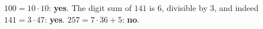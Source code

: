 $100=10\cdot10$: \textbf{yes}. The digit sum of $141$ is $6$, divisible by $3$, and indeed $141=3\cdot47$: \textbf{yes}. $257=7\cdot36+5$: \textbf{no}.
